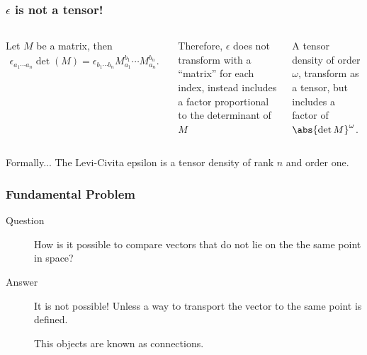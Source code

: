 \begin{frame}
  \frametitle{$\epsilon $ is not a tensor!}
  \begin{columns}
    Let $M$ be a matrix, then 
    \begin{align*}
      \epsilon_{a_1\cdots a_n} \det(M) = \epsilon_{b_1\cdots b_n} M_{a_1}^{b_1}\cdots M_{a_n}^{b_n}.
    \end{align*}
    
    Therefore,  $\epsilon$ does not transform with a ``matrix'' for each index, instead includes a factor proportional to the determinant of $M$
    \begin{definition}
      A \alert{tensor density} of order $\omega$, transform as a tensor, but includes a factor of $\abs{\det{M}}^\omega$.
    \end{definition}
  \end{columns}

  \begin{alertblock}{Formally...}
    The Levi-Civita epsilon is a tensor density of rank $n$ and order one.
  \end{alertblock}
\end{frame}

\begin{frame}
  \frametitle{Fundamental Problem}
  \begin{description}
  \item[Question] How is it possible to compare vectors that do not lie on the the same point in space?
  \item [\alert{Answer}] It is not possible! Unless a way to transport the vector to the same point is defined.

    This objects are known as \alert{connections}.
  \end{description}
\end{frame}

